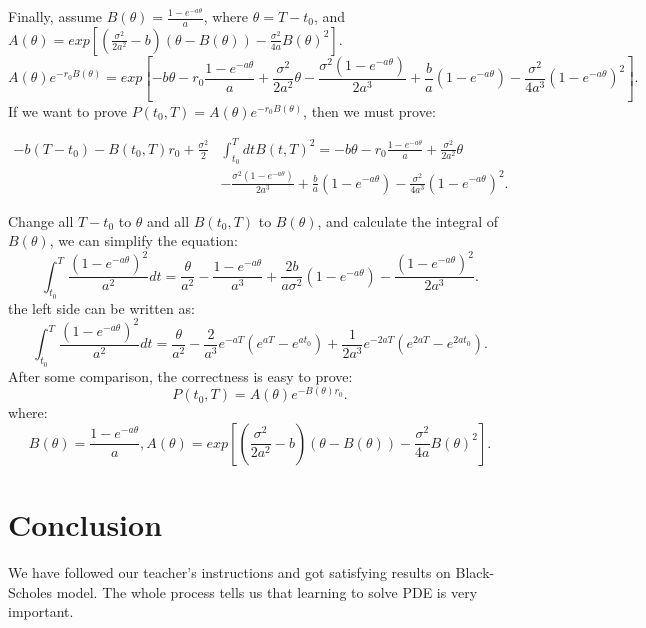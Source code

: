 \documentclass[12pt,a4paper]{paper}
\begin{document}
\indent Finally, assume $B(\theta)=\frac{1-e^{-a\theta}}{a}$, where $\theta=T-t_{0}$, and $A(\theta)=exp[(\frac{\sigma^2}{2a^2}-b)(\theta -B(\theta))-\frac{\sigma ^2}{4a}B(\theta)^2]$.\\
\begin{equation}
A(\theta)e^{-r_{0}B(\theta)}=exp[-b\theta-r_{0}\frac{1-e^{-a\theta}}{a}+\frac{\sigma ^2}{2a^2}\theta - \frac{\sigma ^2 (1-e^{-a\theta})}{2a^3} +\frac{b}{a}(1-e^{-a\theta})-\frac{\sigma ^2}{4a^3}(1-e^{-a\theta})^2].
\end{equation}
\indent If we want to prove $P(t_{0},T)=A(\theta)e^{-r_{0}B(\theta)}$, then we must prove:

\begin{align*}
-b(T-t_{0})-B(t_{0},T)r_{0} +\frac{\sigma ^2}{2}& \int_{t_{0}}^{T}dt B(t,T)^2 =-b\theta-r_{0}\frac{1-e^{-a\theta}}{a}+\frac{\sigma ^2}{2a^2}\theta \\
& - \frac{\sigma ^2 (1-e^{-a\theta})}{2a^3} +\frac{b}{a}(1-e^{-a\theta})-\frac{\sigma ^2}{4a^3}(1-e^{-a\theta})^2.
\end{align*}

Change all $T-t_{0}$ to $\theta$ and all $B(t_{0},T)$ to $B(\theta)$, and calculate the integral of $B(\theta)$, we can simplify the equation:
\begin{equation}
\int_{t_{0}}^{T}\frac{(1-e^{-a\theta})^2}{a^2}dt=\frac{\theta}{a^2}-\frac{1-e^{-a\theta}}{a^3}+\frac{2b}{a\sigma ^2}(1-e^{-a\theta})-\frac{(1-e^{-a\theta})^2}{2a^3}.
\end{equation}
the left side can be written as:
\begin{equation}
\int_{t_{0}}^{T}\frac{(1-e^{-a\theta})^2}{a^2}dt=\frac{\theta}{a^2}-\frac{2}{a^3}e^{-aT}(e^{aT}-e^{at_{0}})+\frac{1}{2a^3}e^{-2aT}(e^{2aT}-e^{2at_{0}}).
\end {equation}
\indent After some comparison, the correctness is easy to prove:
\begin{equation}
P(t_0, T)=A(\theta )e^{-B(\theta) r_{0}}.
\end{equation}
where:
\begin{equation}
B(\theta)=\frac{1-e^{-a\theta}}{a}, A(\theta)=exp[(\frac{\sigma ^2}{2a^2}-b)(\theta -B(\theta))-\frac{\sigma ^2}{4a}B(\theta)^2].
\end{equation}
\section{Conclusion}
We have followed our teacher's instructions and got satisfying results on Black-Scholes model. The whole process tells us that learning to solve PDE is very important.
\end{document}
